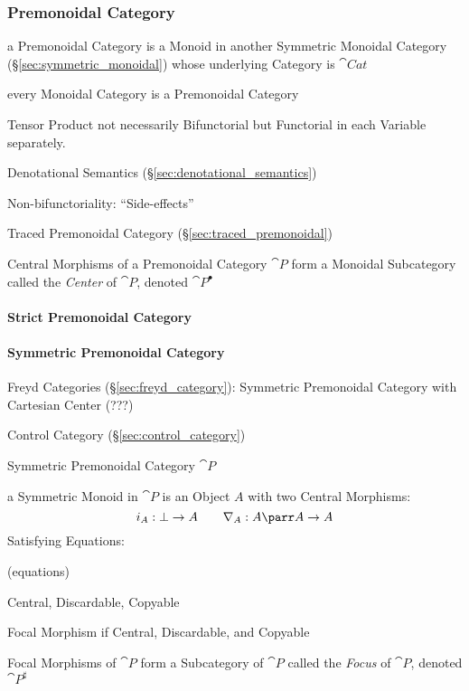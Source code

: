 \subsubsection{Premonoidal Category}\label{sec:premonoidal_category}

a Premonoidal Category is a Monoid in another Symmetric Monoidal
Category (\S\ref{sec:symmetric_monoidal}) whose underlying Category is
$\cat{Cat}$

every Monoidal Category is a Premonoidal Category

Tensor Product not necessarily Bifunctorial but Functorial in each
Variable separately.

Denotational Semantics (\S\ref{sec:denotational_semantics})

Non-bifunctoriality: ``Side-effects'' \cite{jacobs-heunen-hasuo09}

Traced Premonoidal Category (\S\ref{sec:traced_premonoidal})

Central Morphisms of a Premonoidal Category $\cat{P}$ form a Monoidal
Subcategory called the \emph{Center} of $\cat{P}$, denoted
$\cat{P}^\bullet$



\paragraph{Strict Premonoidal Category}\label{sec:strict_premonoidal}
\hfill

\paragraph{Symmetric Premonoidal Category}
\label{sec:symmetric_premonoidal} \hfill

Freyd Categories (\S\ref{sec:freyd_category}): Symmetric Premonoidal
Category with Cartesian Center (???)

Control Category (\S\ref{sec:control_category})

Symmetric Premonoidal Category $\cat{P}$

a Symmetric Monoid in $\cat{P}$ is an Object $A$ with two Central
Morphisms:
\[
  i_A : \bot \rightarrow A \quad\quad
  \nabla_A : A \parr A \rightarrow A
\]
Satisfying Equations:

(equations) %

Central, Discardable, Copyable

Focal Morphism if Central, Discardable, and Copyable

Focal Morphisms of $\cat{P}$ form a Subcategory of $\cat{P}$ called
the \emph{Focus} of $\cat{P}$, denoted $\cat{P}^\sharp$

